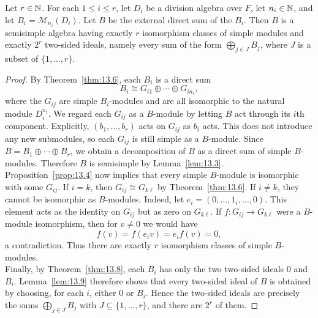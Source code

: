 \documentclass[../Odyssey_Project.tex]{subfiles}
\begin{document}
\begin{theorem}
\label{thm:13.10}
Let $r \in \mathbb{N}$. For each $1 \leq i \leq r$, let $D_i$ be a division algebra over $F$, let $n_i \in \mathbb{N}$, and let $B_i = \mathcal{M}_{n_i}(D_i)$. Let $B$ be the external direct sum of the $B_i$. Then $B$ is a semisimple algebra having exactly $r$ isomorphism classes of simple modules and exactly $2^r$ two-sided ideals, namely every sum of the form $\bigoplus_{j \in J} B_j$, where $J$ is a subset of $\{1, \dots, r\}$.
\end{theorem}
\begin{proof}
    By Theorem~\ref{thm:13.6}, each $B_i$ is a direct sum
    \[
        B_i \cong G_{i1} \oplus \cdots \oplus G_{in_i},
    \]
    where the $G_{ij}$ are simple $B_i$-modules and are all isomorphic to the natural module $D_i^{n_i}$. We regard each $G_{ij}$ as a $B$-module by letting $B$ act through its $i$th component. Explicitly, $(b_1,\ldots,b_r)$ acts on $G_{ij}$ as $b_i$ acts. This does not introduce any new submodules, so each $G_{ij}$ is still simple as a $B$-module. Since $B = B_1 \oplus \cdots \oplus B_r$, we obtain a decomposition of $B$ as a direct sum of simple $B$-modules. Therefore $B$ is semisimple by Lemma~\ref{lem:13.3}.\\
    Proposition~\ref{prop:13.4} now implies that every simple $B$-module is isomorphic with some $G_{ij}$. If $i=k$, then $G_{ij} \cong G_{k\ell}$ by Theorem~\ref{thm:13.6}. If $i \neq k$, they cannot be isomorphic as $B$-modules. Indeed, let $e_i=(0,\ldots,1_i,\ldots,0)$. This element acts as the identity on $G_{ij}$ but as zero on $G_{k\ell}$. If $f \colon G_{ij}\to G_{k\ell}$ were a $B$-module isomorphism, then for $v\neq0$ we would have
    \[
        f(v)=f(e_iv)=e_if(v)=0,
    \]
    a contradiction. Thus there are exactly $r$ isomorphism classes of simple $B$-modules.\\
    Finally, by Theorem~\ref{thm:13.8}, each $B_i$ has only the two two-sided ideals $0$ and $B_i$. Lemma~\ref{lem:13.9} therefore shows that every two-sided ideal of $B$ is obtained by choosing, for each $i$, either $0$ or $B_i$. Hence the two-sided ideals are precisely the sums $\bigoplus_{j \in J}B_j$ with $J \subseteq \{1,\ldots,r\}$, and there are $2^r$ of them.
\end{proof}
\end{document}
